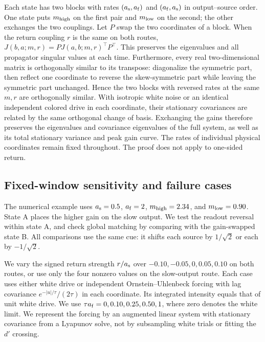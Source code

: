 \documentclass[aps,10pt,onecolumn,superscriptaddress,nofootinbib,
  longbibliography,amsmath,amssymb,floatfix]{revtex4-2}
\begin{document}
Each state has two blocks with rates \((a_{\rm s},a_{\rm f})\)
and \((a_{\rm f},a_{\rm s})\) in output--source order. One state
puts \(m_{\rm high}\) on the first pair and \(m_{\rm low}\) on
the second; the other exchanges the two couplings. Let \(P\)
swap the two coordinates of a block. When the return
coupling \(r\) is the same on both routes,
\(J(b,a;m,r)=P J(a,b;m,r)^\top P^\top\).
This preserves the eigenvalues and all propagator singular
values at each time. Furthermore, every real two-dimensional
matrix is orthogonally similar to its transpose: diagonalize
the symmetric part, then reflect one coordinate to reverse the
skew-symmetric part while leaving the symmetric part unchanged.
Hence the two blocks with reversed rates at the same \(m,r\)
are orthogonally similar. With isotropic white noise or an
identical independent colored drive in each coordinate, their
stationary covariances are related by the same orthogonal
change of basis. Exchanging the gains therefore preserves
the eigenvalues and covariance eigenvalues of the full system,
as well as its total stationary variance and peak gain curve.
The rates of individual physical coordinates remain fixed
throughout. The proof does not apply to one-sided return.

\subsection{Fixed-window sensitivity and failure cases}

The numerical example uses \(a_{\rm s}=0.5\), \(a_{\rm f}=2\),
\(m_{\rm high}=2.34\), and \(m_{\rm low}=0.90\). State A
places the higher gain on the slow output. We test the
readout reversal within state A, and check global matching
by comparing with the gain-swapped state B. All comparisons
use the same cue: it shifts each source by \(1/\sqrt 2\)
or each by \(-1/\sqrt 2\).

We vary the signed return strength \(r/a_{\rm s}\) over
\(-0.10,-0.05,0,0.05,0.10\) on both routes, or use only the
four nonzero values on the slow-output route. Each case
uses either white drive or independent Ornstein--Uhlenbeck
forcing with lag covariance \(e^{-|u|/\tau}/(2\tau)\) in
each coordinate. Its integrated intensity equals that of
unit white drive. We use \(\tau a_{\rm f}=0,0.10,0.25,0.50,1\),
where zero denotes the white limit. We represent the forcing
by an augmented linear system with stationary
covariance from a Lyapunov solve, not by subsampling white
trials or fitting the \(d'\) crossing.
\end{document}
